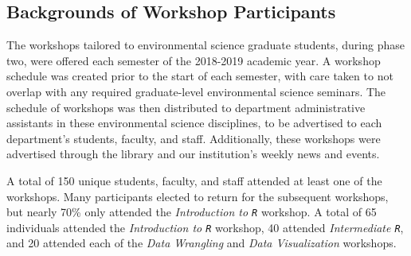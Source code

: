 \documentclass[12pt]{article}
\begin{document}
% 
% 


\subsection{Backgrounds of Workshop Participants}

\quad The workshops tailored to environmental science graduate students, during phase two, were offered each semester of the 2018-2019 academic year. A workshop schedule was created prior to the start of each semester, with care taken to not overlap with any required graduate-level environmental science seminars. The schedule of workshops was then distributed to department administrative assistants in these environmental science disciplines, to be advertised to each department's students, faculty, and staff. Additionally, these workshops were advertised through the library and our institution's weekly news and events. 

\quad A total of 150 unique students, faculty, and staff attended at least one of the workshops. Many participants elected to return for the subsequent workshops, but nearly 70\% only attended the \emph{Introduction to \texttt{R}} workshop. A total of 65 individuals attended the \emph{Introduction to \texttt{R}} workshop, 40 attended \emph{Intermediate \texttt{R}}, and 20 attended each of the \emph{Data Wrangling} and \emph{Data Visualization} workshops.    
\end{document}
